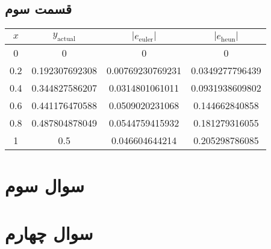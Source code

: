 \documentclass[]{article}
\begin{document}
\subsection*{قسمت سوم}
\begin{latin}
    \centering
    \begin{tabular}{c|c|c|c}
        $x$ & $y_{\text{actual}}$ & $|e_{\text{euler}}|$ & $|e_{\text{heun}}|$\\
        \hline
        0 & 0 & 0 & 0\\
        0.2 & 0.192307692308 & 0.00769230769231 & 0.0349277796439\\
        0.4 & 0.344827586207 & 0.0314801061011 & 0.0931938609802 \\
        0.6 & 0.441176470588 & 0.0509020231068 & 0.144662840858\\
        0.8 & 0.487804878049 & 0.0544759415932 & 0.181279316055\\
        1 & 0.5 & 0.046604644214 & 0.205298786085\\
    \end{tabular}
\end{latin}
\section*{سوال سوم}
\section*{سوال چهارم}
\end{document}

